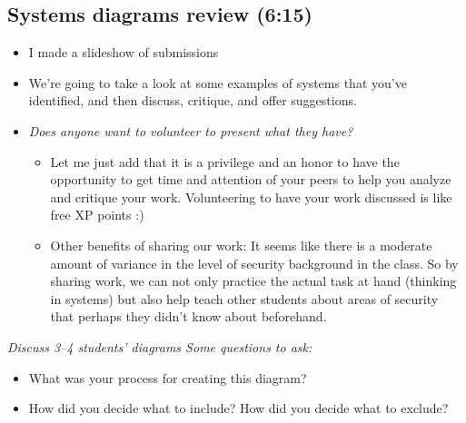 \documentclass[11pt]{article}
\begin{document}




\subsection{Systems diagrams review (6:15)}

\begin{itemize}
    \item I made a slideshow of submissions
    \item We're going to take a look at some examples of systems that you've identified, and then discuss, critique, and offer suggestions.
   \item {\it Does anyone want to volunteer to present what they have?}
    \begin{itemize}
        \item Let me just add that it is a privilege and an honor to have the opportunity to get time and attention of your peers to help you analyze and critique your work. Volunteering to have your work discussed is like free XP points :) 
        \item Other benefits of sharing our work: It seems like there is a moderate amount of variance in the level of security background in the class. So by sharing work, we can not only practice the actual task at hand (thinking in systems) but also help teach other students about areas of security that perhaps they didn't know about beforehand.
    \end{itemize}
\end{itemize}

{\it Discuss 3--4 students' diagrams Some questions to ask:}
{\it 
\begin{itemize}
    \item What was your process for creating this diagram?
    \item How did you decide what to include? How did you decide what to exclude?
\end{itemize}
}
\end{document}
